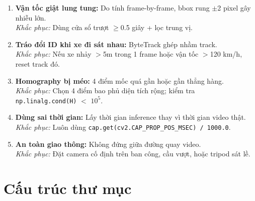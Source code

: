 \documentclass[11pt,a4paper]{article}
\begin{document}
\begin{enumerate}
    \item \textbf{Vận tốc giật lung tung:} Do tính frame-by-frame, bbox rung $\pm$2 pixel gây nhiễu lớn.\\
    \textit{Khắc phục:} Dùng cửa sổ trượt $\ge$0.5 giây + lọc trung vị.

    \item \textbf{Tráo đổi ID khi xe đi sát nhau:} ByteTrack ghép nhầm track.\\
    \textit{Khắc phục:} Nếu xe nhảy $>$5m trong 1 frame hoặc vận tốc $>$120 km/h, reset track đó.

    \item \textbf{Homography bị méo:} 4 điểm mốc quá gần hoặc gần thẳng hàng.\\
    \textit{Khắc phục:} Chọn 4 điểm bao phủ diện tích rộng; kiểm tra \texttt{np.linalg.cond(H)} $<$ $10^5$.

    \item \textbf{Dùng sai thời gian:} Lấy thời gian inference thay vì thời gian video thật.\\
    \textit{Khắc phục:} Luôn dùng \texttt{cap.get(cv2.CAP\_PROP\_POS\_MSEC) / 1000.0}.

    \item \textbf{An toàn giao thông:} Không đứng giữa đường quay video.\\
    \textit{Khắc phục:} Đặt camera cố định trên ban công, cầu vượt, hoặc tripod sát lề.
\end{enumerate}

\section{Cấu trúc thư mục}
\end{document}

